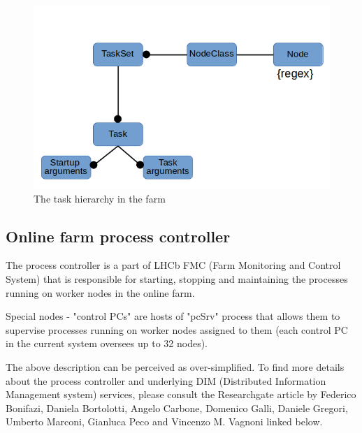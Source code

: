 \documentclass{customization}
\begin{document}
\begin{figure}[H]
    \centering
    \includegraphics[scale=0.45]{images/hierarchy.png}
    \caption{The task hierarchy in the farm}
    \label{fig:hierarchy}
\end{figure}


\subsection{Online farm process controller}
\hspace{0.6cm}

The process controller is a part of LHCb FMC (Farm Monitoring and Control System) that is responsible for starting, stopping and maintaining the processes running on worker nodes in the online farm.
\newline

\noindent
Special nodes - "control PCs" are hosts of "pcSrv" process that allows them to supervise processes running on worker nodes assigned to them (each control PC in the current system oversees up to 32 nodes).
\newline

\noindent
The above description can be perceived as over-simplified. To find more details about the process controller and underlying DIM (Distributed Information Management system) services, please consult the Researchgate article by Federico Bonifazi, Daniela Bortolotti, Angelo Carbone, Domenico Galli, Daniele Gregori, Umberto Marconi, Gianluca Peco and Vincenzo M. Vagnoni linked below.
\newline

\noindent{}
\end{document}
